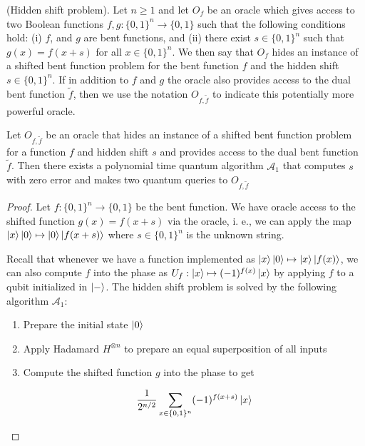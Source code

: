 \documentclass[main.tex]{subfiles}
\begin{document}
\begin{definition}
(Hidden shift problem). Let $n \geq 1$ and let $O_f$ be an oracle which gives access to two Boolean functions $f, g : \{0, 1\}^n \rightarrow \{0, 1\}$ such that the following conditions hold: (i) $f$, and $g$ are bent functions, and (ii) there exist $s \in \{0, 1\}^n$ such that $g(x) = f(x + s)$ for all $x \in \{0, 1\}^n$. We then say that $O_f$ hides an instance of a shifted bent function problem for the bent function $f$ and the hidden shift $s \in \{0, 1\}^n$. If in addition to $f$ and $g$ the oracle also provides access to the dual bent function $\tilde{f}$, then we use the notation $O_{f,\tilde{f}}$ to indicate this potentially more powerful oracle.	
\end{definition}

\begin{theorem}
Let $O_{f,\tilde{f}}$ be an oracle that hides an instance of a shifted bent function problem for a function $f$ and hidden shift $s$ and provides access to the dual bent function $\tilde{f}$. Then there exists a polynomial time quantum algorithm $\mathcal{A}_1$ that computes $s$ with zero error and makes two quantum queries to $O_{f,\tilde{f}}$

\begin{proof}
	Let $f: \{0,1\}^n \rightarrow \{0, 1\}$ be the bent function. We have oracle access to the shifted function $g(x) = f(x+s)$ via the oracle, i. e., we can apply the map $\ket{x}\ket{0} \mapsto \ket{0}\ket{f(x+s)}$ where $s \in \{0, 1\}^n$ is the unknown string. 
	
Recall that whenever we have a function implemented as $\ket{x}\ket{0} \mapsto \ket{x}\ket{f(x)}$, we can also compute $f$ into the phase as $U_f : \ket{x} \mapsto (-1)^{f(x)}\ket{x}$ by applying $f$ to a qubit initialized in $\ket{-}$. The hidden shift problem is solved by the following algorithm $\mathcal{A_1}$: 

\begin{enumerate}
\item Prepare the initial state $\ket{0}$
\item Apply Hadamard $H^{\otimes n}$ to prepare an equal superposition of all inputs
\item Compute the shifted function $g$ into the phase to get

\begin{align*}
\frac{1}{2^{n/2}}\sum_{x \in \{0, 1\}^n}	(-1)^{f(x+s)}\ket{x}
\end{align*}


\end{enumerate}
\end{proof}
\end{theorem}
\end{document}
